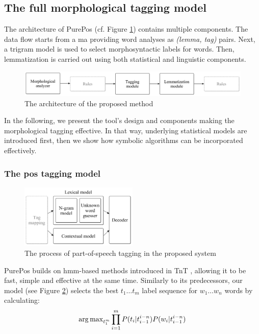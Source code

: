 \subsection{The full morphological tagging model}
\label{sec:purepos}

The architecture of PurePos (cf. Figure \ref{fig:purepos-arch}) contains multiple components. 
The data flow starts from a \gls{ma} providing word analyses as \emph{(lemma, tag)} pairs. 
Next, a trigram model is used to select morphosyntactic labels for words. 
Then, lemmatization is carried out using both statistical and linguistic components. 

\begin{figure}[H]
  \centering
  \includegraphics[width=1\textwidth]{MorphTagging/architecture.png} 
  \caption{The architecture of the proposed method}
  \label{fig:purepos-arch}
\end{figure}

In the following, we present the tool's design and components making the morphological tagging effective. 
In that way,  underlying statistical models are introduced first, then we show how symbolic algorithms can be incorporated effectively. 

\subsubsection{The \gls{pos} tagging model}

\begin{figure}[ht]
  \centering
  \includegraphics[width=0.5\textwidth]{MorphTagging/pos_arch.png} 
  \caption{The process of part-of-speech tagging in the proposed system}
  \label{fig:pos_arch}
\end{figure}

PurePos builds on \acrshort{hmm}-based methods \cite{Rabiner1989,Samuelsson1993} introduced in TnT \cite{Brants2000}, allowing it to be fast, simple and effective at the same time. 
Similarly to its predecessors, our model (see Figure \ref{fig:pos_arch}) selects the best $t_1 \dots t_m$ label sequence for $w_1 \dots w_n$ words by calculating:
\begin{equation}
\operatorname{arg\,max}_{t_1^m} \prod_{i=1}^m P(t_i | t_{i-1}^{i-n}) P(w_i|t_{i-1}^{i-n})
\end{equation}

